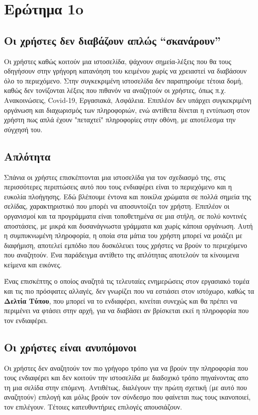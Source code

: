 \documentclass[12pt]{article}
\begin{document}
\section{Ερώτημα 1o}

\subsection{Οι χρήστες δεν διαβάζουν απλώς “σκανάρουν”}
Οι χρήστες καθώς κοιτούν μια ιστοσελίδα, ψάχνουν σημεία-λέξεις που θα τους οδηγήσουν στην γρήγορη κατανόηση του κειμένου χωρίς να χρειαστεί να διαβάσουν όλο το περιεχόμενο. Στην συγκεκριμένη ιστοσελίδα δεν παρατηρούμε τέτοια δομή, καθώς δεν τονίζονται λέξεις που πιθανόν να αναζητούν οι χρήστες, όπως π.χ. Ανακοινώσεις, \textlatin{Covid-19}, Εργασιακά, Ασφάλεια. Επιπλέον δεν υπάρχει συγκεκριμένη οργάνωση και διαχωρισμός των πληροφοριών, ενώ αντίθετα δίνεται η εντύπωση στον χρήστη πως απλά έχουν "πεταχτεί" πληροφορίες στην οθόνη, με αποτέλεσμα την σύγχησή του.

\subsection{Απλότητα}
Σπάνια οι χρήστες επισκέπτονται μια ιστοσελίδα για τον σχεδιασμό της, στις περισσότερες περιπτώσεις αυτό που τους ενδιαφέρει είναι το περιεχόμενο και η ευκολία πλοήγησης. Εδώ βλέπουμε έντονα και ποικίλα χρώματα σε πολλά σημεία της σελίδας, χαρακτηριστικό που μπορέι να αποσυντοίζει τον χρήστη. Επιπλέον οι οργανισμοί και τα προγράμματα είναι τοποθετημένα σε μια στήλη, σε πολύ κοντινές αποστάσεις, με μικρά και δυσανάγνωστα γράμματα και χωρίς κάποια οργάνωση.
Αυτή η συμπυκνωμένη πληροφορία, η οποία στα μάτια του χρήστη μπορεί να μοιάζει με διαφήμιση, αποτελεί εμπόδιο που δυσκόλευει τους χρήστες να βρούν το περιεχόμενο που αναζητούν. Ένα παράδειγμα αντίθετο της απλότητας αποτελούν τα κίνουμενα κείμενα και εικόνες.

Ένας επισκέπτης ο οποίος αναζητά τις τελευταίες ενημερώσεις στον εργασιακό τομέα και τις πιο πρόσφατες αλλαγές, δεν γνωρίζει που να εστιάσει στον ιστόχωρο, καθώς τα \textbf{Δελτία Τύπου}, που μπορεί να το ενδιαφέρει, κινείται συνεχώς και θα πρέπει να περιμένει να φτάσει στην αρχή, για να διαβάσει αν βρίσκεται εκεί η πληροφορία που τον ενδιαφέρει. 

\subsection{Οι χρήστες είναι ανυπόμονοι}
Οι χρήστες δεν αναζητούν τον πιο γρήγορο τρόπο για να βρούν την πληροφορία που τους ενδιαφέρει και δεν κοιτούν την ιστοσελίδα με διαδοχικό τρόπο πηγαίνοντας απο τη μια σελίδα στην επόμενη. Αντιθέτως, διαλέγουν την πρώτη σχετική (με αυτό που αναζητούν) επιλογή και μόλις βρούν τον σύνδεσμο που φαίνεται πως τους ικανοποιεί, τον επιλέγουν. Τέτοιες κατευθυντήριες επιλογές απουσιάζουν. 
\end{document}
